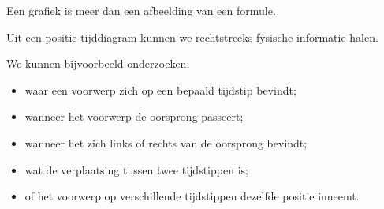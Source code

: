 \documentclass{ximera}
\begin{document}


Een grafiek is meer dan een afbeelding van een formule.

Uit een positie-tijddiagram kunnen we rechtstreeks fysische
informatie halen.

We kunnen bijvoorbeeld onderzoeken:

\begin{itemize}
  \item waar een voorwerp zich op een bepaald tijdstip bevindt;
  \item wanneer het voorwerp de oorsprong passeert;
  \item wanneer het zich links of rechts van de oorsprong bevindt;
  \item wat de verplaatsing tussen twee tijdstippen is;
  \item of het voorwerp op verschillende tijdstippen dezelfde
        positie inneemt.
\end{itemize}
\end{document}

